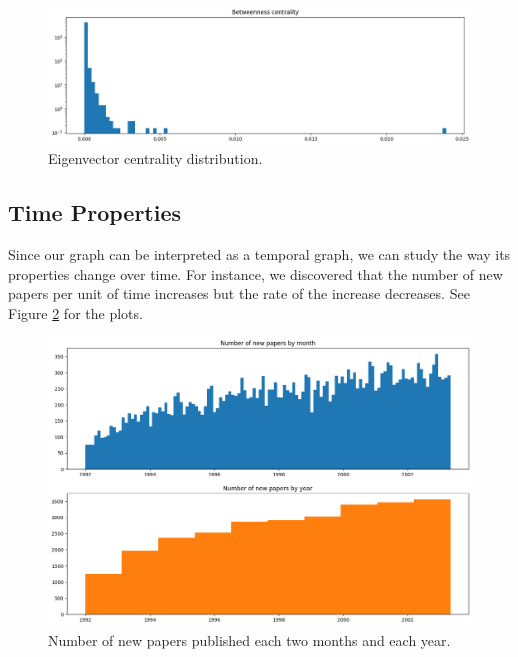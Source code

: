 \documentclass{article}
\newcommand\tab[1][1cm]{\hspace*{#1}}
\begin{document}
\begin{itemize}
\begin{figure}[h]
\centering
\includegraphics[width=1\linewidth]{centralities_betweenness.png}
\caption{Eigenvector centrality distribution.} \label{plot:centrality:betweenness}
\end{figure}
\end{itemize}

\subsection{Time Properties}
\tab Since our graph can be interpreted as a temporal graph, we can study the way its properties change over time. For instance, we discovered that the number of new papers per unit of time increases but the rate of the increase decreases. See Figure \ref{plot:number_of_new_papers} for the plots.
\begin{figure}[h]
\centering
\includegraphics[width=0.9\linewidth]{new_papers_over_time.png}
\caption{Number of new papers published each two months and each year.}
\label{plot:number_of_new_papers}
\end{figure}
\end{document}
